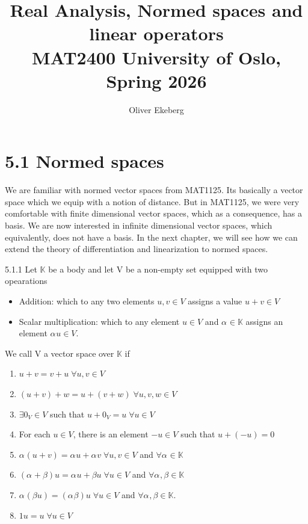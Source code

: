 \documentclass[a4paper,norsk]{article}
\title{Real Analysis, Normed spaces and linear operators \\ MAT2400 University of Oslo, Spring 2026}
\author{Oliver Ekeberg}
\begin{document}
\maketitle
\tableofcontents



\section*{5.1 Normed spaces}




We are familiar with normed vector spaces from MAT1125. Its basically a vector space which we equip with a notion of distance. But in MAT1125, we were very comfortable with finite dimensional vector spaces, which as a consequence, has a basis. We are now interested in infinite dimensional vector spaces, which equivalently, does not have a basis. In the next chapter, we will see how we can extend the theory of differentiation and linearization to normed spaces.


\begin{definitionbox}{5.1.1}{}
Let $ \mathbb{K} $ be a body and let V be a non-empty set equipped with two opearations
\begin{itemize}
    \item Addition: which to any two elements $ u, v \in V $  assigns a value $ u + v \in V  $ 
    \item Scalar multiplication: which to any element $ u \in V $ and $ \alpha_{}^{}  \in \mathbb{K} $ assigns an element $ \alpha_{}^{} u \in V $.
\end{itemize}


We call V a vector space over $ \mathbb{K}  $  if
\begin{enumerate}
    \item $ u+v = v+u \; \forall u, v \in V $ 
    \item $ \left( u+v \right) +w = u + \left( v+w \right)  \; \forall u,v,w \in V$ 
    \item $ \exists 0_V \in V $ such that $ u + 0_V = u \; \forall  u \in V $
    \item For each $ u \in V $, there is an element $ -u \in V $ such that $ u + \left( -u \right) = 0 $ 
    \item $ \alpha_{}^{} \left( u + v \right) = \alpha_{}^{} u + \alpha_{}^{} v \; \forall  u, v \in V  $ and $ \forall \alpha_{}^{} \in \mathbb{K}  $ 
    \item $ \left( \alpha_{}^{} + \beta \right) u = \alpha_{}^{} u + \beta u \; \forall u \in V  $ and $ \forall \alpha_{}^{} , \beta \in \mathbb{K}  $ 
    \item $ \alpha_{}^{} \left( \beta u \right) = \left( \alpha_{}^{} \beta \right) u \; \forall  u \in  V $ and $ \forall \alpha_{}^{} , \beta \in \mathbb{K}  $.
    \item $ 1u = u \; \forall  u \in V $ 
\end{enumerate}
\end{definitionbox}
\end{document}
